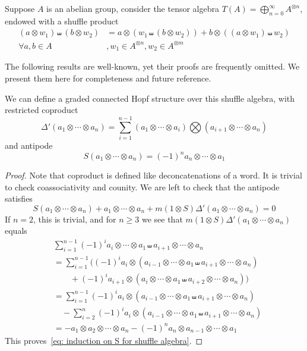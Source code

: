 \begin{definition}
Suppose $A$ is an abelian group, consider the tensor algebra $\displaystyle T(A)=\bigoplus_{n=0}^\infty A^{\otimes n}$, endowed with a shuffle product
\begin{equation}
\begin{aligned}
(a\otimes w_1)\shuffle(b\otimes w_2)&=a\otimes (w_1\shuffle(b\otimes w_2))+b\otimes ((a\otimes w_1)\shuffle w_2)\\
\forall a,b\in A&,w_1\in A^{\otimes n},w_2\in A^{\otimes m}
\end{aligned}
\end{equation}
\end{definition}

The following results are well-known, yet their proofs are frequently omitted. We present them here for completeness and future reference.

\begin{proposition}
We can define a graded connected Hopf structure over this shuffle algebra, with restricted coproduct
\begin{equation}
\Delta'(a_1\otimes\cdots\otimes a_n)=\sum_{i=1}^{n-1}\left(a_1\otimes\cdots\otimes a_i\right)\bigotimes\left(a_{i+1}\otimes\cdots\otimes a_n\right)
\end{equation}
and antipode
\begin{equation}
S(a_1\otimes\cdots\otimes a_n)=(-1)^na_n\otimes\cdots\otimes a_1
\end{equation}
\end{proposition}

\begin{proof}
Note that coproduct is defined like deconcatenations of a word. It is trivial to check coassociativity and counity. We are left to check that the antipode satisfies
\begin{equation}\label{eq: induction on S for shuffle algebra}
S(a_1\otimes\cdots\otimes a_n)+a_1\otimes\cdots\otimes a_n+m(1\otimes S)\Delta'(a_1\otimes\cdots\otimes a_n)=0
\end{equation}
If $n=2$, this is trivial, and for $n\geq3$ we see that $m(1\otimes S)\Delta'(a_1\otimes\cdots\otimes a_n)$ equals
\begin{align*}
&\sum_{i=1}^{n-1}(-1)^ia_i\otimes\cdots\otimes a_1\shuffle a_{i+1}\otimes\cdots\otimes a_n\\
&=\sum_{i=1}^{n-1}\Big((-1)^ia_i\otimes\left(a_{i-1}\otimes\cdots\otimes a_1\shuffle a_{i+1}\otimes\cdots\otimes a_n\right)\\
&\qquad+(-1)^ia_{i+1}\otimes\left(a_{i}\otimes\cdots\otimes a_1\shuffle a_{i+2}\otimes\cdots\otimes a_n\right)\Big)\\
&=\sum_{i=1}^{n-1}(-1)^ia_i\otimes\left(a_{i-1}\otimes\cdots\otimes a_1\shuffle a_{i+1}\otimes\cdots\otimes a_n\right)\\
&\quad-\sum_{i=2}^{n}(-1)^{i}a_{i}\otimes\left(a_{i-1}\otimes\cdots\otimes a_1\shuffle a_{i+1}\otimes\cdots\otimes a_n\right)\\
&=-a_1\otimes a_2\otimes\cdots\otimes a_n-(-1)^na_{n}\otimes a_{n-1}\otimes\cdots\otimes a_1
\end{align*}
This proves~\eqref{eq: induction on S for shuffle algebra}.
\end{proof}

